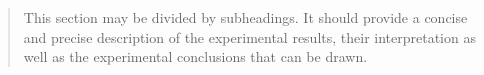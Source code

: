 \documentclass[remotesensing,article,submit,moreauthors,pdftex]{Definitions/mdpi}
\begin{document}
\begin{quote}
This section may be divided by subheadings. It should provide a concise and precise description of the experimental results, their interpretation as well as the experimental conclusions that can be drawn.
\end{quote}







 
\end{document}
